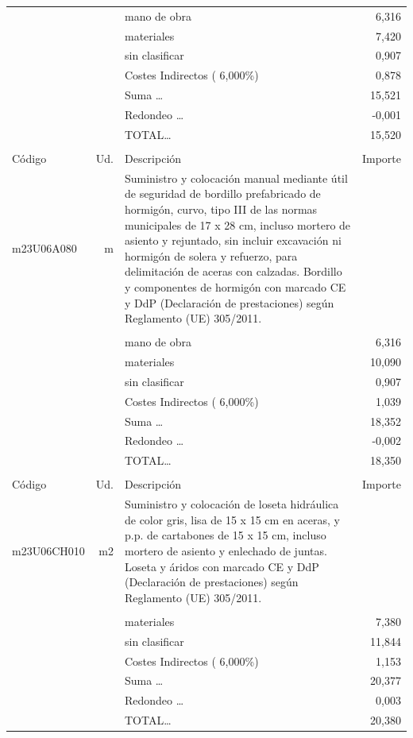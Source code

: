 \documentclass{book}%
\begin{document}
\begin{supertabular}{l r p{60mm} r}
&&mano de obra&     6,316\\%
&&materiales&     7,420\\%
&&sin clasificar&     0,907\\%
&&Costes Indirectos (     6,000\%)&     0,878\\%
&&Suma \ldots&    15,521\\%
&&Redondeo \ldots&    {-}0,001\\%
%
&&TOTAL\ldots&    15,520\\%
&&&\\%
Código&Ud.&Descripción&Importe\\%
\hline%
m23U06A080&m&Suministro y colocación manual mediante útil de seguridad de bordillo prefabricado de hormigón, curvo, tipo III de las normas municipales de 17 x 28 cm, incluso mortero de asiento y rejuntado, sin incluir excavación ni hormigón de solera y refuerzo, para delimitación de aceras con calzadas. Bordillo y componentes de hormigón con marcado CE y DdP (Declaración de prestaciones) según Reglamento (UE) 305/2011.&\\%
&&&\\%
&&mano de obra&     6,316\\%
&&materiales&    10,090\\%
&&sin clasificar&     0,907\\%
&&Costes Indirectos (     6,000\%)&     1,039\\%
&&Suma \ldots&    18,352\\%
&&Redondeo \ldots&    {-}0,002\\%
%
&&TOTAL\ldots&    18,350\\%
&&&\\%
Código&Ud.&Descripción&Importe\\%
\hline%
m23U06CH010&m2&Suministro y colocación de loseta hidráulica de color gris, lisa de 15 x 15 cm en aceras, y p.p. de cartabones de 15 x 15 cm, incluso mortero de asiento y enlechado de juntas. Loseta y áridos con marcado CE y DdP (Declaración de prestaciones) según Reglamento (UE) 305/2011.&\\%
&&&\\%
&&materiales&     7,380\\%
&&sin clasificar&    11,844\\%
&&Costes Indirectos (     6,000\%)&     1,153\\%
&&Suma \ldots&    20,377\\%
&&Redondeo \ldots&     0,003\\%
%
&&TOTAL\ldots&    20,380\\%

\end{supertabular}
\end{document}
